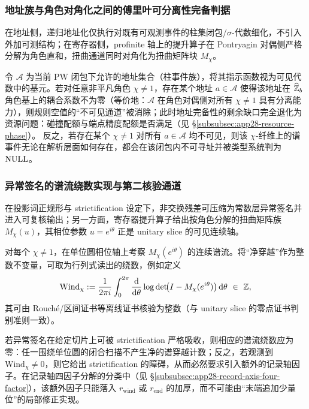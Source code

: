 \subsubsection{地址族与角色对角化之间的傅里叶可分离性完备判据}\label{subsubsec:app28-fourier-separability}
在地址侧，递归地址化仅执行对既有可观测事件的柱集闭包/$\sigma$-代数细化，不引入外加可测结构；在寄存器侧，profinite 轴上的提升算子在 Pontryagin 对偶侧严格分解为角色直和，扭曲通道同时对角化为扭曲矩阵块 $M_\chi$。
\par
令 $\mathcal{A}$ 为当前 PW 闭包下允许的地址集合（柱事件族），将其指示函数视为可见代数中的基元。若对任意非平凡角色 $\chi\neq 1$，存在某个地址 $a\in\mathcal{A}$ 使得该地址在 $\widehat{\mathbb{Z}}_b$ 角色基上的耦合系数不为零（等价地：$\mathcal{A}$ 在角色对偶侧对所有 $\chi\neq 1$ 具有分离能力），则规则空值的“不可见通道”被消除；此时地址完备性的剩余缺口完全退化为资源问题：碰撞配额与端点精度配额是否满足（见 \S\ref{subsubsec:app28-resource-phase}）。
反之，若存在某个 $\chi\neq 1$ 对所有 $a\in\mathcal{A}$ 均不可见，则该 $\chi$-纤维上的谱事件无论在解析层面如何存在，都会在该闭包内不可寻址并被类型系统判为 $\mathrm{NULL}$。

\subsubsection{异常签名的谱流绕数实现与第二核验通道}\label{subsubsec:app28-winding-channel}
在投影词正规形与 strictification 设定下，非交换残差可压缩为常数层异常签名并进入可复核输出；另一方面，寄存器提升算子给出按角色分解的扭曲矩阵族 $M_\chi(u)$，其相位参数 $u=e^{i\theta}$ 正是 unitary slice 的可见连续轴。
\par
对每个 $\chi\neq 1$，在单位圆相位轴上考察 $M_\chi(e^{i\theta})$ 的连续谱流。将“净穿越”作为整数不变量，可取为行列式读出的绕数，例如定义
$$
\mathrm{Wind}_\chi
:=\frac{1}{2\pi i}\int_{0}^{2\pi}\frac{\mathrm{d}}{\mathrm{d}\theta}\log\det\!\bigl(I-M_\chi(e^{i\theta})\bigr)\,\mathrm{d}\theta
\ \in\ \mathbb{Z},
$$
其可由 Rouch{\'e}/区间证书等离线证书核验为整数（与 unitary slice 的零点证书判别准则一致）。
\par
若异常签名在给定切片上可被 strictification 严格吸收，则相应的谱流绕数应为零：任一围绕单位圆的闭合扫描不产生净的谱穿越计数；反之，若观测到 $\mathrm{Wind}_\chi\neq 0$，则它给出 strictification 的障碍，从而必然要求引入额外的记录轴因子。在记录轴四因子分解的分类中（见 \S\ref{subsubsec:app28-record-axis-four-factor}），该额外因子只能落入 $r_{\mathrm{wind}}$ 或 $r_{\mathrm{end}}$ 的加厚，而不可能由“末端追加少量位”的局部修正实现。

